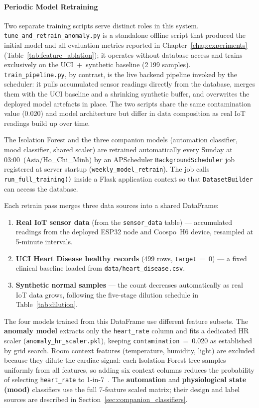 \FloatBarrier

\paragraph{Periodic Model Retraining}
\label{subsec:periodic_retrain}

Two separate training scripts serve distinct roles in this system.
\texttt{tune\_and\_retrain\_anomaly.py} is a standalone offline script
that produced the initial model and all evaluation metrics reported in
Chapter~\ref{chap:experiments} (Table~\ref{tab:feature_ablation}); it
operates without database access and trains exclusively on the
UCI~+~synthetic baseline (2\,199 samples).
\texttt{train\_pipeline.py}, by contrast, is the live backend pipeline
invoked by the scheduler: it pulls accumulated sensor readings directly
from the database, merges them with the UCI baseline and a shrinking
synthetic buffer, and overwrites the deployed model artefacts in place.
The two scripts share the same contamination value (0.020) and model
architecture but differ in data composition as real IoT readings build up
over time.

The Isolation Forest and the three companion models (automation classifier,
mood classifier, shared scaler) are retrained automatically every Sunday
at 03:00~(Asia/Ho\_Chi\_Minh) by an APScheduler \texttt{BackgroundScheduler}
job registered at server startup (\texttt{weekly\_model\_retrain}).
The job calls \texttt{run\_full\_training()} inside a Flask application
context so that \texttt{DatasetBuilder} can access the database.

Each retrain pass merges three data sources into a shared DataFrame:
\begin{enumerate}
    \item \textbf{Real IoT sensor data} (from the \texttt{sensor\_data} table) ---
    accumulated readings from the deployed ESP32 node and Coospo~H6 device,
    resampled at 5-minute intervals.
    \item \textbf{UCI Heart Disease healthy records} (499 rows, \texttt{target}~=~0)
    --- a fixed clinical baseline loaded from \texttt{data/heart\_disease.csv}.
    \item \textbf{Synthetic normal samples} --- the count decreases automatically
    as real IoT data grows, following the five-stage dilution schedule in
    Table~\ref{tab:dilution}.
\end{enumerate}

The four models trained from this DataFrame use different feature subsets.
The \textbf{anomaly model} extracts only the \texttt{heart\_rate} column and
fits a dedicated HR scaler (\texttt{anomaly\_hr\_scaler.pkl}), keeping
\texttt{contamination}~=~0.020 as established by grid search.
Room context features (temperature, humidity, light) are excluded because
they dilute the cardiac signal: each Isolation Forest tree samples uniformly
from all features, so adding six context columns reduces the probability of
selecting \texttt{heart\_rate} to 1-in-7~\cite{Liu2008}.
The \textbf{automation} and \textbf{physiological state (mood)} classifiers
use the full 7-feature scaled matrix; their design and label sources are
described in Section~\ref{sec:companion_classifiers}.

